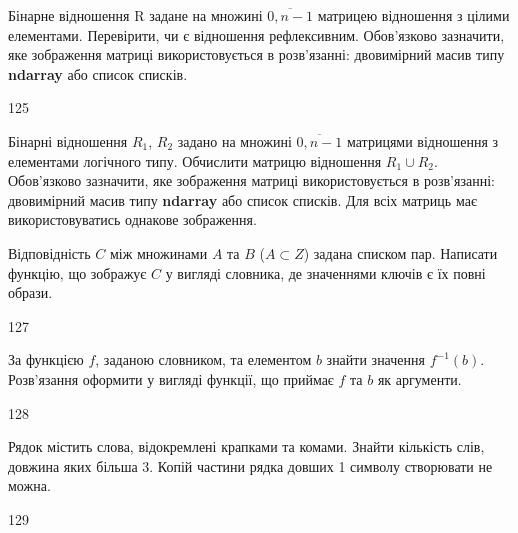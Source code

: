 Бінарне відношення R задане на множині $\overline{0,n-1}$ матрицею відношення з цілими елементами.  Перевірити, чи є відношення рефлексивним. Обов'язково зазначити, яке зображення матриці використовується в розв'язанні: двовимірний масив типу \textbf{ndarray} або список списків.
\\\par
125 














Бінарні відношення $R_1$, $R_2$ задано на множині $\overline{0,n-1}$ матрицями відношення з елементами логічного типу. Обчислити матрицю відношення $R_1\cup R_2$. Обов'язково зазначити, яке зображення матриці використовується в розв'язанні: двовимірний масив типу \textbf{ndarray} або список списків. Для всіх матриць має використовуватись однакове зображення.
\\\par
{} 














Відповідність $C$ між множинами $A$ та $B$ ($A\subset Z$) задана списком пар. Написати функцію, що зображує $C$ у вигляді словника, де значеннями ключів є їх повні образи.
\\\par

127 














За функцією $f$, заданою словником, та елементом $b$ знайти значення $f^{-1}(b)$. Розв’язання оформити у вигляді функції, що приймає $f$ та $b$ як аргументи.
\\\par
128 














Рядок містить слова, відокремлені крапками та комами. Знайти кількість слів, довжина яких більша 3. Копій частини рядка довших 1 символу створювати не можна.
\\\par
129 














